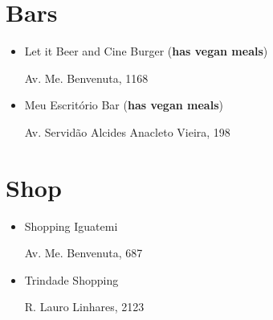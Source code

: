 \documentclass[10pt]{article}
\begin{document}
\section*{Bars}

\begin{itemize}
  \item Let it Beer and Cine Burger (\textbf{has vegan meals})

    Av. Me. Benvenuta, 1168
  \item Meu Escritório Bar (\textbf{has vegan meals})

    Av. Servidão Alcides Anacleto Vieira, 198
\end{itemize}

\section*{Shop}

\begin{itemize}
  \item Shopping Iguatemi

    Av. Me. Benvenuta, 687

  \item Trindade Shopping

    R. Lauro Linhares, 2123
\end{itemize}
\end{document}
